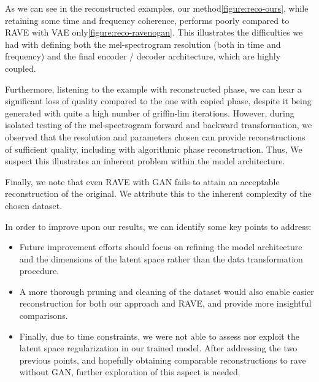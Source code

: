 \documentclass{article}
\begin{document}
As we can see in the reconstructed examples, our method\ref{figure:reco-ours}, while retaining some time and frequency coherence, performs poorly compared to RAVE with VAE only\ref{figure:reco-ravenogan}. This illustrates the difficulties we had with defining both the mel-spectrogram resolution (both in time and frequency) and the final encoder / decoder architecture, which are highly coupled.

Furthermore, listening to the example with reconstructed phase, we can hear a significant loss of quality compared to the one with copied phase, despite it being generated with quite a high number of griffin-lim iterations. However, during isolated testing of the mel-spectrogram forward and backward transformation, we observed that the resolution and parameters chosen can provide reconstructions of sufficient quality, including with algorithmic phase reconstruction. Thus, We suspect this illustrates an inherent problem within the model architecture.

Finally, we note that even RAVE with GAN fails to attain an acceptable reconstruction of the original. We attribute this to the inherent complexity of the chosen dataset.

In order to improve upon our results, we can identify some key points to address: 
\begin{itemize}
    \item Future improvement efforts should focus on refining the model architecture and the dimensions of the latent space rather than the data transformation procedure.
    \item A more thorough pruning and cleaning of the dataset would also enable easier reconstruction for both our approach and RAVE, and provide more insightful comparisons.
    \item Finally, due to time constraints, we were not able to assess nor exploit the latent space regularization in our trained model. After addressing the two previous points, and hopefully obtaining comparable reconstructions to rave without GAN, further exploration of this aspect is needed.
\end{itemize}
\end{document}
